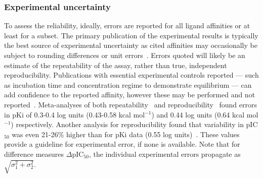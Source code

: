 \documentclass[9pt,bestpractices]{livecoms}
\begin{document}
\subsubsection{Experimental uncertainty}
\label{sec:exp_uncertainty}
To assess the reliability, ideally, errors are reported for all ligand affinities or at least for a subset. The primary publication of the experimental results is typically the best source of experimental uncertainty as cited affinities may occasionally be subject to rounding differences or unit errors~\cite{kramer2012experimental}. Errors quoted will likely be an estimate of the repeatability of the assay, rather than true, independent reproducibility. Publications with essential experimental controls reported --- such as incubation time and concentration regime to demonstrate equilibrium --- can add confidence to the reported affinity, however these may be performed and not reported~\cite{jarmoskaite2020measure}. Meta-analyses of both repeatability~\cite{sheridan2020experimental} and reproducibility~\cite{kramer2012experimental} found errors in pKi of 0.3-0.4 log units (0.43-0.58 kcal mol$^{-1}$) and 0.44 log units (0.64 kcal mol$^{-1}$) respectively.  Another analysis for reproducibility found that variability in pIC$_{50}$ was even 21-26\% higher than for pKi data (0.55 log units)~\cite{kalliokoski_comparability_2013}. These values provide a guideline for experimental error, if none is available. Note that for difference measures $\Delta $pIC$_{50}$, the individual experimental errors propagate as $\sqrt{\sigma_1^2+\sigma_2^2}$.
\end{document}
